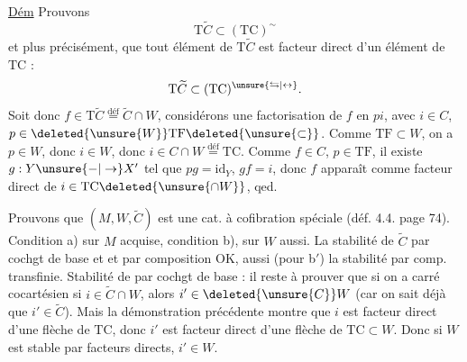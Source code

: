 
\uline{Dém} Prouvons
\[
\mathrm{T}\widetilde C\subset(\mathrm{TC})^{\sim}
\]
et plus précisément, que tout élément de $\mathrm{T}\widetilde C$ est facteur direct d'un élément de $\mathrm{TC}$ :
\[
\mathrm{T}\widetilde C\subset(\mathrm{TC})^{\unsure{\leftrightarrows|\leftrightarrow}}.
\]
Soit donc $f\in\mathrm{T}\widetilde C\overset{\mathrm{déf}}{=}\widetilde C\cap W$, considérons une
factorisation de $f$ en $pi$, avec $i\in C$, $p\in\deleted{\unsure{W}}\mathrm{TF}\deleted{\unsure{\subset}}$. Comme $\mathrm{TF}\subset W$, on a $p\in W$, donc $i\in W$, donc $i\in C\cap W\overset{\mathrm{déf}}{=}\mathrm{TC}$. Comme $f\in C$, $p\in\mathrm{TF}$, il existe $g:Y\unsure{\mathbin{-}|\to}X'$ tel que $pg=\mathrm{id}_Y$, $gf=i$, donc $f$ apparaît comme facteur direct de $i\in\mathrm{TC}\deleted{\unsure{\cap W}}$, qed.

Prouvons que $(M,W,\widetilde C)$ est une cat. à cofibration spéciale (déf. 4.4. page 74). Condition a) sur $M$ acquise, condition b),  sur $W$ aussi. La stabilité de $\widetilde C$ par cochgt de base et et par composition OK, aussi (pour b$'$) la stabilité par comp. transfinie. Stabilité de  par cochgt de base : il reste à prouver que si on a carré cocartésien
si $i\in\widetilde C\cap W$, alors $i'\in\deleted{\unsure{C}} W$ (car on sait déjà que $i'\in\widetilde C$). Mais la démonstration précédente montre que $i$ est facteur direct  d'une flèche de $\mathrm{TC}$, donc $i'$ est facteur direct d'une flèche de $\mathrm{TC}\subset W$.  Donc si $W$ est stable par facteurs directs,  $i'\in W$.
